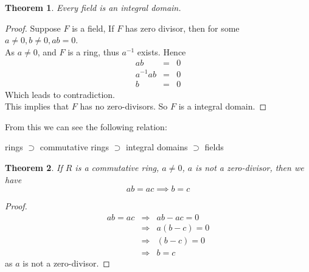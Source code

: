 \documentclass{article}
\theoremstyle{MyNonumberplain}
\theoremstyle{break}
\newtheorem*{proof}{Proof. }
\theoremstyle{break}
\newtheorem{theorem}{Theorem}[section]
\theoremstyle{break}
\theoremstyle{definition}
\theoremstyle{break}
\begin{document}
\begin{thmbox}
    \begin{theorem}
        Every field is an integral domain.
    \end{theorem}
    \begin{prfbox}
        \begin{proof}
            Suppose $F$ is a field, If $F$ has zero divisor, then for some $a \neq 0, b
            \neq 0, a b = 0$.\\
            
            As $a \neq 0$, and $F$ is a ring, thus $a^{- 1}$ exists. Hence
            \begin{eqnarray*}
              a b & = & 0\\
              a^{- 1} a b & = & 0\\
              b & = & 0
            \end{eqnarray*}
            Which leads to contradiction.\\
            
            This implies that $F$ has no zero-divisors. So $F$ is a integral domain.
        \end{proof}
    \end{prfbox}
\end{thmbox}

From this we can see the following relation:

\begin{center}
    rings $\supset$ commutative rings $\supset$ integral domains $\supset$ fields
\end{center}

\begin{thmbox}
    \begin{theorem}
        If $R$ is a commutative ring, $a \neq 0$, $a$ is not a zero-divisor, then we
        have
        $$ab=ac\implies b=c$$
    \end{theorem}
    \begin{prfbox}
        \begin{proof}
            \begin{eqnarray*}
                a b = a c & \Rightarrow & a b - a c = 0\\
                & \Rightarrow & a (b - c) = 0\\
                & \Rightarrow & (b - c) = 0\\
                & \Rightarrow & b = c
              \end{eqnarray*}
              as $a$ is not a zero-divisor.
        \end{proof}
    \end{prfbox}
\end{thmbox}
\end{document}
